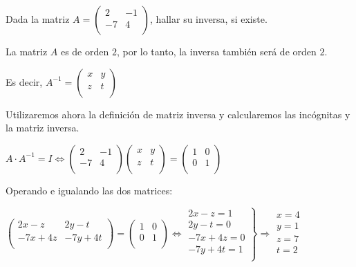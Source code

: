 \begin{ejemplo}
Dada la matriz    $A= \begin{pmatrix} 
 2& -1 \\
 -7& 4 \\
\end{pmatrix}$, hallar su inversa, si existe.

\tcblower
La matriz $A$ es de orden $2$, por lo tanto, la inversa también será de orden $2$.

Es decir, $A^{-1}=\begin{pmatrix} 
 x& y \\
 z& t \\ 
\end{pmatrix}$

Utilizaremos ahora la definición de matriz inversa y calcularemos las incógnitas y la matriz inversa.

$A\cdot A^{-1}= I \Leftrightarrow \begin{pmatrix} 
 2& -1 \\
 -7& 4 \\
\end{pmatrix} 
\begin{pmatrix} 
 x& y \\
 z& t \\ 
\end{pmatrix}
=\begin{pmatrix} 
 1& 0 \\
 0& 1 \\ 
\end{pmatrix}$

Operando e igualando las dos matrices:

$\begin{pmatrix} 
 2x-z& 2y-t \\
 -7x+4z& -7y+4t \\ 
\end{pmatrix}=\begin{pmatrix} 
 1& 0 \\
 0& 1 \\ 
\end{pmatrix} \Leftrightarrow
\left. 
\begin{array}{l}
 2x-z = 1 \\
 2y-t = 0 \\
 -7x+4z = 0 \\
 -7y+4t = 1 \\
\end{array}
\right\rbrace
\Rightarrow 
\begin{array}{l}
 x = 4 \\
 y =1 \\
 z =7 \\
 t = 2 \\
\end{array} $


\end{ejemplo}
